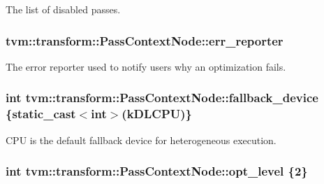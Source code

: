 The list of disabled passes. 

\subsubsection[{\texorpdfstring{err\+\_\+reporter}{err_reporter}}]{ tvm\+::transform\+::\+Pass\+Context\+Node\+::err\+\_\+reporter}\hypertarget{classtvm_1_1transform_1_1PassContextNode_aaa3ce0ad4b706d1a38ea953e52941c12}{}\label{classtvm_1_1transform_1_1PassContextNode_aaa3ce0ad4b706d1a38ea953e52941c12}


The error reporter used to notify users why an optimization fails. 

\subsubsection[{\texorpdfstring{fallback\+\_\+device}{fallback_device}}]{\setlength{\rightskip}{0pt plus 5cm}int tvm\+::transform\+::\+Pass\+Context\+Node\+::fallback\+\_\+device \{static\+\_\+cast$<$int$>$(k\+D\+L\+C\+PU)\}}\hypertarget{classtvm_1_1transform_1_1PassContextNode_a0b98ed8aa5bbb660801a9608759a00a9}{}\label{classtvm_1_1transform_1_1PassContextNode_a0b98ed8aa5bbb660801a9608759a00a9}


C\+PU is the default fallback device for heterogeneous execution. 

\subsubsection[{\texorpdfstring{opt\+\_\+level}{opt_level}}]{\setlength{\rightskip}{0pt plus 5cm}int tvm\+::transform\+::\+Pass\+Context\+Node\+::opt\+\_\+level \{2\}}\hypertarget{classtvm_1_1transform_1_1PassContextNode_af166034a8746d65044eea0a2673de991}{}\label{classtvm_1_1transform_1_1PassContextNode_af166034a8746d65044eea0a2673de991}


